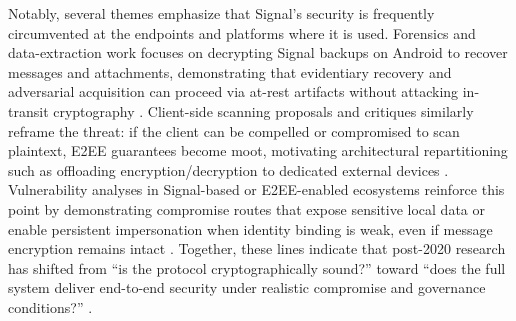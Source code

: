 Notably, several themes emphasize that Signal’s security is frequently circumvented at the endpoints and platforms where it is used. Forensics and data-extraction work focuses on decrypting Signal backups on Android to recover messages and attachments, demonstrating that evidentiary recovery and adversarial acquisition can proceed via at-rest artifacts without attacking in-transit cryptography \cite{krishnapriya2021}. Client-side scanning proposals and critiques similarly reframe the threat: if the client can be compelled or compromised to scan plaintext, E2EE guarantees become moot, motivating architectural repartitioning such as offloading encryption/decryption to dedicated external devices \cite{alsop2025}. Vulnerability analyses in Signal-based or E2EE-enabled ecosystems reinforce this point by demonstrating compromise routes that expose sensitive local data or enable persistent impersonation when identity binding is weak, even if message encryption remains intact \cite{jain2021,zhao2022}. Together, these lines indicate that post-2020 research has shifted from “is the protocol cryptographically sound?” toward “does the full system deliver end-to-end security under realistic compromise and governance conditions?” \cite{jain2021,alsop2025,krishnapriya2021}.

